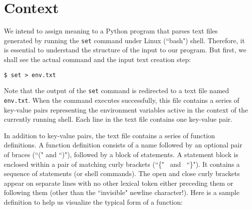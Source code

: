 \documentclass[10pt, a4paper]{article}
\begin{document}


\section{Context}
We intend to assign meaning to a Python program that parses text files generated by running the \texttt{set} command under Linux (``bash") shell. Therefore, it is essential to understand the structure of the input to our program. But first, we shall see the actual command and the input text creation step:
{
\begin{lstlisting}
$ set > env.txt
\end{lstlisting}}

\noindent Note that the output of the \texttt{set} command is redirected to a text file named \texttt{env.txt}. When the command executes successfully, this file contains a series of key-value pairs representing the environment variables active in the context of the currently running shell. Each line in the text file contains one key-value pair. 

In addition to key-value pairs, the text file contains a series of function definitions. A function definition consists of a name followed by an optional pair of braces (``(" and ``)"), followed by a block of statements. A statement block is enclosed within a pair of matching curly brackets (``\{" \ and \ ``\}"). It contains a sequence of statements (or shell commands). The open and close curly brackets appear on separate lines with no other lexical token either preceding them or following them (other than the ``invisible" newline character!). Here is a sample definition to help us visualize the typical form of a function:
\end{document}
